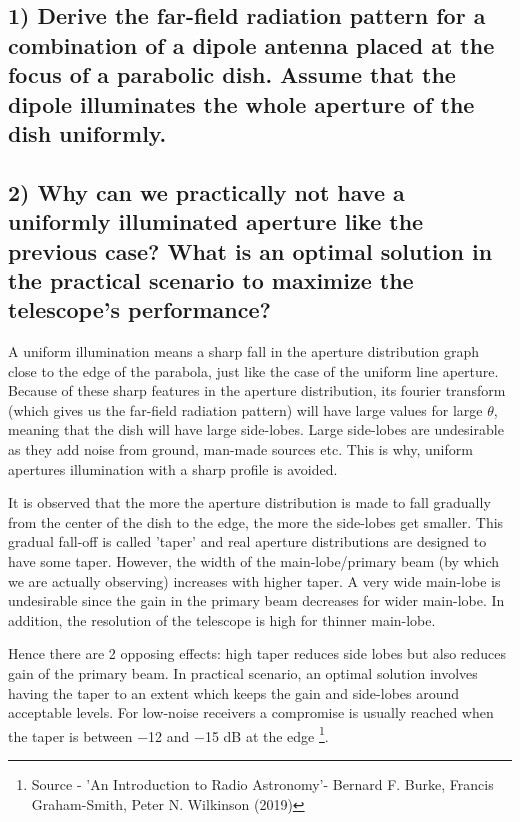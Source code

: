 \documentclass[12pt,a4paper, margin=3in]{article}
\begin{document}
\subsection*{1) Derive the far-field radiation pattern for a combination of a dipole antenna placed at the focus of a parabolic dish. Assume that the dipole illuminates the whole aperture of the dish uniformly.
}

\large 

\subsection*{2) Why can we practically not have a uniformly illuminated aperture like the previous case? What is an optimal solution in the practical scenario to maximize the telescope's performance?
}

\large A uniform illumination means a sharp fall in the aperture distribution graph close to the edge of the parabola, just like the case of the uniform line aperture. Because of these sharp features in the aperture distribution, its fourier transform (which gives us the far-field radiation pattern) will have large values for large $\theta$, meaning that the dish will have large side-lobes. Large side-lobes are undesirable as they add noise from ground, man-made sources etc. This is why, uniform apertures illumination with a sharp profile is avoided. 

It is observed that the more the aperture distribution is made to fall gradually from the center of the dish to the edge, the more the side-lobes get smaller. This gradual fall-off is called 'taper' and real aperture distributions are designed to have some taper. However, the width of the main-lobe/primary beam (by which we are actually observing) increases with higher taper. A very wide main-lobe is undesirable since the gain in the primary beam decreases for wider main-lobe. In addition, the resolution of the telescope is high for thinner main-lobe. 

Hence there are 2 opposing effects: high taper reduces side lobes but also reduces gain of the primary beam. In practical scenario, an optimal solution involves having the taper to an extent which keeps the gain and side-lobes around acceptable levels. For low-noise receivers a compromise is usually reached when the taper is between −12 and −15 dB at the edge \footnote{Source - 'An Introduction to Radio Astronomy'- Bernard F. Burke, Francis Graham-Smith, Peter N. Wilkinson (2019)}. 

\newpage 
\end{document}
